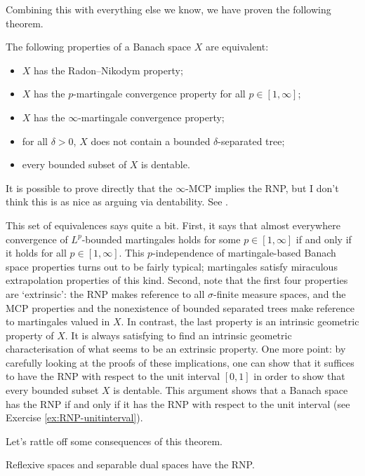 Combining this with everything else we know, we have proven the following theorem.
\begin{thm}
  The following properties of a Banach space $X$ are equivalent:
  \begin{itemize}
  \item $X$ has the Radon--Nikodym property;
  \item $X$ has the $p$-martingale convergence property for all $p \in [1,\infty]$;
  \item $X$ has the $\infty$-martingale convergence property;
  \item for all $\delta > 0$, $X$ does not contain a bounded $\delta$-separated tree;
  \item every bounded subset of $X$ is dentable.
  \end{itemize}
\end{thm}

\begin{rmk}
  It is possible to prove directly that the $\infty$-MCP implies the RNP, but I don't think this is as nice as arguing via dentability.
  See \cite[Proof of Theorem 2.9]{gP16}.
\end{rmk}

This set of equivalences says quite a bit.
First, it says that almost everywhere convergence of $L^p$-bounded martingales holds for some $p \in [1,\infty]$ if and only if it holds for all $p \in [1,\infty]$.
This $p$-independence of martingale-based Banach space properties turns out to be fairly typical; martingales satisfy miraculous extrapolation properties of this kind.
Second, note that the first four properties are `extrinsic': the RNP makes reference to all $\sigma$-finite measure spaces, and the MCP properties and the nonexistence of bounded separated trees make reference to martingales valued in $X$.
In contrast, the last property is an intrinsic geometric property of $X$.
It is always satisfying to find an intrinsic geometric characterisation of what seems to be an extrinsic property.
One more point: by carefully looking at the proofs of these implications, one can show that it suffices to have the RNP with respect to the unit interval $[0,1]$ in order to show that every bounded subset $X$ is dentable.
This argument shows that a Banach space has the RNP if and only if it has the RNP with respect to the unit interval (see Exercise \ref{ex:RNP-unitinterval}).

Let's rattle off some consequences of this theorem.

\begin{cor}
  Reflexive spaces and separable dual spaces have the RNP.
\end{cor}

